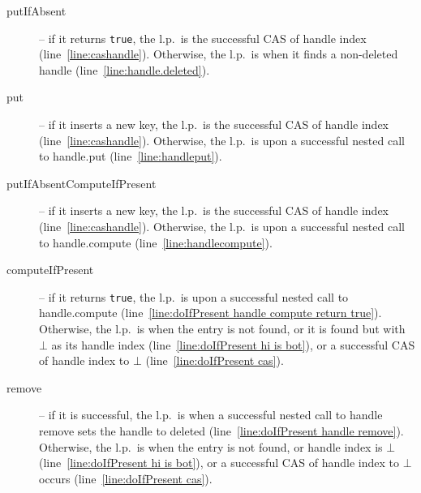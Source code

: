 \begin{description}

\item[putIfAbsent] -- if it returns \texttt{true}, the l.p.\ is the successful CAS of handle index (line~\ref{line:cashandle}).
Otherwise, the l.p.\ is when it finds a non-deleted handle
(line~\ref{line:handle.deleted}).

\item[put] -- if it inserts a new key, the l.p.\ is the successful CAS of handle index (line~\ref{line:cashandle}).
Otherwise, 
 the l.p.\ is upon %
 a successful nested call to handle.put (line~\ref{line:handleput}).

\item[putIfAbsentComputeIfPresent] -- if it inserts a new key, the l.p.\ is the successful CAS of handle index (line~\ref{line:cashandle}).
Otherwise, 
the l.p.\ is upon 
a successful nested call to handle.compute (line~\ref{line:handlecompute}).

\item[computeIfPresent] -- if it returns \texttt{true}, the l.p.\ is 
upon a successful nested call to handle.compute (line~\ref{line:doIfPresent handle compute return true}). Otherwise, 
the l.p.\ is when the entry is not found, or it is found but with $\bot$ as its handle index (line~\ref{line:doIfPresent hi is bot}), 
or a successful CAS of handle index to $\bot$ (line~\ref{line:doIfPresent cas}).

\item[remove] -- if it is successful, the l.p.\ is when 
a successful nested call to handle remove 
sets the handle to deleted (line~\ref{line:doIfPresent handle remove}).
Otherwise, 
the l.p.\ is when the entry is not found, or handle index is $\bot$ (line~\ref{line:doIfPresent hi is bot}), or 
a successful CAS of handle index to $\bot$ occurs (line~\ref{line:doIfPresent cas}).


\end{description}
